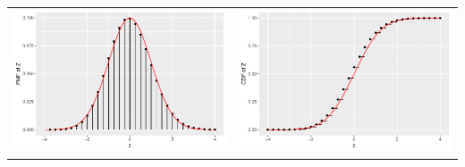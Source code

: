 \begin{frame}
\begin{center}
{      \begin{tabular}{cc}
      \includegraphics[width = .5\textwidth]{figure/clt1-13} &
      \includegraphics[width = .5\textwidth]{figure/clt1-14}
      \end{tabular}
    }
  \end{center}
  
\end{frame}




    
    
    
    


  
  
  
  
